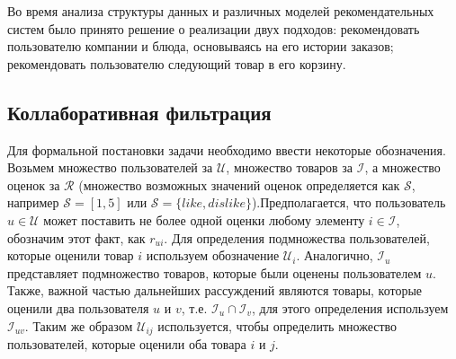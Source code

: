 Во время анализа структуры данных и различных моделей рекомендательных систем было
принято решение о реализации двух подходов: рекомендовать пользователю компании и
блюда, основываясь на его истории заказов; рекомендовать пользователю следующий
товар в его корзину.

\subsection{Коллаборативная фильтрация}

Для формальной постановки задачи необходимо ввести некоторые обозначения. Возьмем
множество пользователей за $\mathcal{U}$, множество товаров за $\mathcal{I}$, а
множество оценок за $\mathcal{R}$ (множество возможных значений оценок
определяется как $\mathcal{S}$, например $\mathcal{S}=[1,5]$ или
$\mathcal{S}=\{like, dislike\}$).Предполагается, что пользователь $u \in \mathcal{U}$
может поставить не более одной оценки любому элементу $i \in \mathcal{I}$,
обозначим этот факт, как $r_{ui}$. Для определения подмножества
пользователей, которые оценили товар $i$ используем обозначение $\mathcal{U}_i$.
Аналогично, $\mathcal{I}_u$ представляет подмножество товаров, которые были оценены
пользователем $u$. Также, важной частью дальнейших
рассуждений являются товары, которые оценили два пользователя $u$
и $v$, т.е. $\mathcal{I}_u \cap \mathcal{I}_v$, для этого определения
используем $\mathcal{I}_{uv}$. Таким же образом $\mathcal{U}_{ij}$ используется,
чтобы определить множество пользователей, которые оценили оба товара $i$ и $j$.

